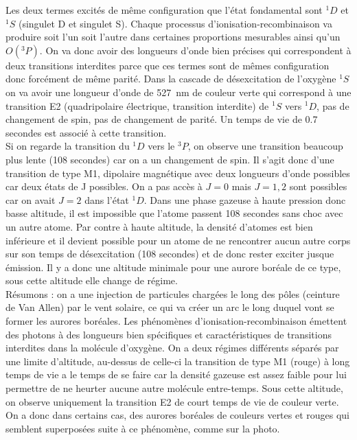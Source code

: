 Les deux termes excités de même configuration que l'état fondamental sont $^1D$ et $^1S$ (singulet D et singulet S). Chaque processus d'ionisation-recombinaison va produire soit l'un soit l'autre dans certaines proportions mesurables ainsi qu'un $O(^3P)$. On va donc avoir des longueurs d'onde bien précises qui correspondent à deux transitions interdites parce que ces termes sont de mêmes configuration donc forcément de même parité. Dans la cascade de désexcitation de l'oxygène $^1S$ on va avoir une longueur d'onde de \SI{527}{nm} de couleur verte qui correspond à une transition E2 (quadripolaire électrique, transition interdite) de  $^1S$ vers $^1D$, pas de changement de spin, pas de changement de parité. Un temps de vie de 0.7 secondes est associé à cette transition.\\

Si on regarde la transition du $^1D$ vers le $^3P$, on observe une transition beaucoup plus lente (108 secondes) car on a un changement de spin. Il s'agit donc d'une transition de type M1, dipolaire magnétique avec deux longueurs d'onde possibles car deux états de J possibles. On a pas accès à $J=0$ mais $J=1,2$ sont possibles car on avait $J=2$ dans l'état $^1D$. Dans une phase gazeuse à haute pression donc basse altitude, il est impossible que l'atome passent 108 secondes sans choc avec un autre atome. Par contre à haute altitude, la densité d'atomes est bien inférieure et il devient possible pour un atome de ne rencontrer aucun autre corps sur son temps de désexcitation (108 secondes) et de donc rester exciter jusque émission. Il y a donc une altitude minimale pour une aurore boréale de ce type, sous cette altitude elle change de régime.\\

Résumons : on a une injection de particules chargées le long des pôles (ceinture de Van Allen) par le vent solaire, ce qui va créer un arc le long duquel vont se former les aurores boréales. Les phénomènes d'ionisation-recombinaison émettent des photons à des longueurs bien spécifiques et caractéristiques de transitions interdites dans la molécule d'oxygène. On a deux régimes différents séparés par une limite d'altitude, au-dessus de celle-ci la transition de type M1 (rouge) à long temps de vie a le temps de se faire car la densité gazeuse est assez faible pour lui permettre de ne heurter aucune autre molécule entre-temps. Sous cette altitude, on observe uniquement la transition E2 de court temps de vie de couleur verte. On a donc dans certains cas, des aurores boréales de couleurs vertes et rouges qui semblent superposées suite à ce phénomène, comme sur la photo.\\

